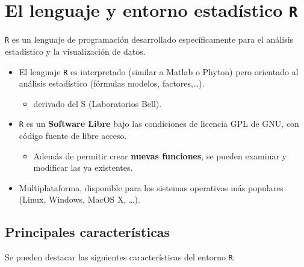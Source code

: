 \documentclass[]{book}
\providecommand{\tightlist}{%
  \setlength{\itemsep}{0pt}\setlength{\parskip}{0pt}}
\begin{document}
\section{\texorpdfstring{El lenguaje y entorno estadístico
\texttt{R}}{El lenguaje y entorno estadístico R}}\label{el-lenguaje-y-entorno-estadistico-r}

\texttt{R} es un lenguaje de programación desarrollado específicamente
para el análisis estadístico y la visualización de datos.

\begin{itemize}
\item
  El lenguaje \texttt{R} es interpretado (similar a Matlab o Phyton)
  pero orientado al análisis estadístico (fórmulas modelos,
  factores,\ldots{}).

  \begin{itemize}
  \tightlist
  \item
    derivado del S (Laboratorios Bell).
  \end{itemize}
\item
  \texttt{R} es un \textbf{Software Libre} bajo las condiciones de
  licencia GPL de GNU, con código fuente de libre acceso.

  \begin{itemize}
  \tightlist
  \item
    Además de permitir crear \textbf{nuevas funciones}, se pueden
    examinar y modificar las ya existentes.
  \end{itemize}
\item
  Multiplataforma, disponible para los sistemas operativos más populares
  (Linux, Windows, MacOS X, \ldots{}).
\end{itemize}

\subsection{Principales
características}\label{principales-caracteristicas}

Se pueden destacar las siguientes características del entorno
\texttt{R}:
\end{document}
